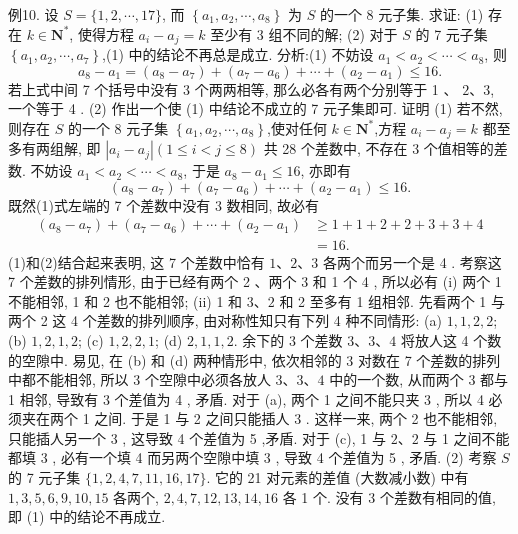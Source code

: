 例10. 设 $S=\{1,2, \cdots, 17\}$, 而 $\left\{a_1, a_2, \cdots, a_8\right\}$ 为 $S$ 的一个 8 元子集.
求证:
(1) 存在 $k \in \mathbf{N}^*$, 使得方程 $a_i-a_j=k$ 至少有 3 组不同的解;
(2) 对于 $S$ 的 7 元子集 $\left\{a_1, a_2, \cdots, a_7\right\}$,(1) 中的结论不再总是成立.
分析:(1) 不妨设 $a_1<a_2<\cdots<a_8$, 则
$$
a_8-a_1=\left(a_8-a_7\right)+\left(a_7-a_6\right)+\cdots+\left(a_2-a_1\right) \leqslant 16 .
$$
若上式中间 7 个括号中没有 3 个两两相等, 那么必各有两个分别等于 1 、 $2 、 3$, 一个等于 4 .
(2) 作出一个使 (1) 中结论不成立的 7 元子集即可.
证明 (1) 若不然,则存在 $S$ 的一个 8 元子集 $\left\{a_1, a_2, \cdots, a_8\right\}$,使对任何 $k \in \mathbf{N}^*$,方程 $a_i-a_j=k$ 都至多有两组解, 即 $\left|a_i-a_j\right|(1 \leqslant i<j \leqslant 8)$ 共 28 个差数中, 不存在 3 个值相等的差数.
不妨设 $a_1<a_2<\cdots<a_8$, 于是 $a_8-a_1 \leqslant 16$, 亦即有
$$
\left(a_8-a_7\right)+\left(a_7-a_6\right)+\cdots+\left(a_2-a_1\right) \leqslant 16 .
$$
既然(1)式左端的 7 个差数中没有 3 数相同, 故必有
$$
\begin{aligned}
\left(a_8-a_7\right)+\left(a_7-a_6\right)+\cdots+\left(a_2-a_1\right) & \geqslant 1+1+2+2+3+3+4 \\
& =16 .
\end{aligned}
$$
(1)和(2)结合起来表明, 这 7 个差数中恰有 $1 、 2 、 3$ 各两个而另一个是 4 .
考察这 7 个差数的排列情形, 由于已经有两个 2 、两个 3 和 1 个 4 , 所以必有
(i) 两个 1 不能相邻, 1 和 2 也不能相邻;
(ii) 1 和 $3 、 2$ 和 2 至多有 1 组相邻.
先看两个 1 与两个 2 这 4 个差数的排列顺序, 由对称性知只有下列 4 种不同情形:
(a) $1,1,2,2$;
(b) $1,2,1,2$;
(c) $1,2,2,1$;
(d) $2,1,1,2$.
余下的 3 个差数 $3 、 3 、 4$ 将放人这 4 个数的空隙中.
易见, 在 (b) 和 (d) 两种情形中, 依次相邻的 3 对数在 7 个差数的排列中都不能相邻, 所以 3 个空隙中必须各放人 $3 、 3 、 4$ 中的一个数, 从而两个 3 都与 1 相邻, 导致有 3 个差值为 4 , 矛盾.
对于 (a), 两个 1 之间不能只夹 3 , 所以 4 必须夹在两个 1 之间.
于是 1 与 2 之间只能插人 3 . 这样一来, 两个 2 也不能相邻, 只能插人另一个 3 , 这导致 4 个差值为 5 ,矛盾.
对于 (c), 1 与 $2 、 2$ 与 1 之间不能都填 3 , 必有一个填 4 而另两个空隙中填 3 , 导致 4 个差值为 5 , 矛盾.
(2) 考察 $S$ 的 7 元子集 $\{1,2,4,7,11,16,17\}$. 它的 21 对元素的差值 (大数减小数) 中有 $1,3,5,6,9,10,15$ 各两个, $2,4,7,12,13,14,16$ 各 1 个.
没有 3 个差数有相同的值, 即 (1) 中的结论不再成立.


